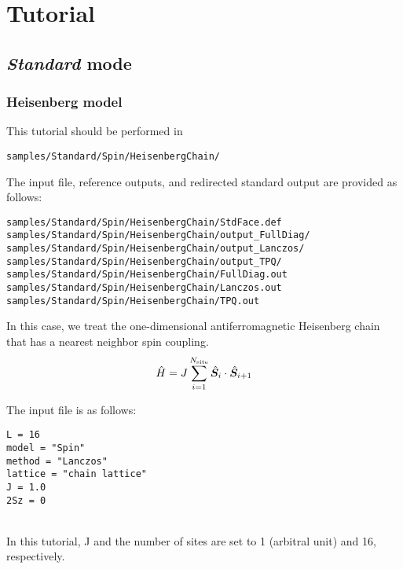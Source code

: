 \chapter{Tutorial}
\label{Ch:model}
\section{{\it Standard} mode}

\subsection{Heisenberg model}

This tutorial should be performed in 
\begin{verbatim}
samples/Standard/Spin/HeisenbergChain/
\end{verbatim}

The input file, reference outputs, and redirected standard output are
provided as follows:
\begin{verbatim}
samples/Standard/Spin/HeisenbergChain/StdFace.def
samples/Standard/Spin/HeisenbergChain/output_FullDiag/
samples/Standard/Spin/HeisenbergChain/output_Lanczos/
samples/Standard/Spin/HeisenbergChain/output_TPQ/
samples/Standard/Spin/HeisenbergChain/FullDiag.out
samples/Standard/Spin/HeisenbergChain/Lanczos.out
samples/Standard/Spin/HeisenbergChain/TPQ.out
\end{verbatim}
%
In this case, we treat the one-dimensional antiferromagnetic Heisenberg chain
that has a nearest neighbor spin coupling.
\begin{align}
  {\hat H} = J \sum_{i=1}^{N_{\rm site}} {\hat {\boldsymbol S}}_i \cdot {\hat {\boldsymbol S}}_{i+1}
\end{align}

The input file is as follows:
\\
\begin{minipage}{10cm}
\begin{screen}
\begin{verbatim}
L = 16
model = "Spin"
method = "Lanczos"
lattice = "chain lattice"
J = 1.0
2Sz = 0
\end{verbatim}
\end{screen}
\end{minipage}
%
\\
In this tutorial, J and the number of sites are set to 1 (arbitral unit)
and 16, respectively.

